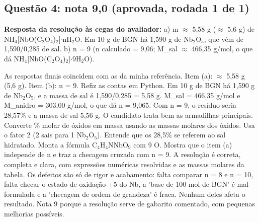 \documentclass{article}%
\begin{document}
\subsection*{Questão 4: nota 9,0 (aprovada, rodada 1 de 1)}%
\textbf{Resposta da resolução às cegas do avaliador:} a) m $\approx$ 5,58 g ($\approx$ 5,6 g) de NH$_{4}${[}NbO(C$_{2}$O$_{4}$)$_{2}${]}$\cdot$nH$_{2}$O. Em 10 g de BGN há 1,590 g de Nb$_{2}$O$_{5}$, que vêm de 1,590/0,285 de sal.\newline%
b) n = 9 (n calculado = 9,06; M\_sal $\approx$ 466,35 g/mol, o que dá NH$_{4}${[}NbO(C$_{2}$O$_{4}$)$_{2}${]}$\cdot$9H$_{2}$O).\par %
As respostas finais coincidem com as da minha referência. Item (a): $\approx$ 5,58 g (5,6 g). Item (b): n = 9. Refiz as contas em Python. Em 10 g de BGN há 1,590 g de Nb$_{2}$O$_{5}$, e a massa de sal é 1,590/0,285 = 5,58 g. M\_sal = 466,35 g/mol e M\_anidro = 303,00 g/mol, o que dá n = 9,065. Com n = 9, o resíduo seria 28,57\% e a massa de sal 5,56 g. O candidato trata bem as armadilhas principais. Converte \% molar de óxidos em massa usando as massas molares dos óxidos. Usa o fator 2 (2 sais para 1 Nb$_{2}$O$_{5}$). Entende que os 28,5\% se referem ao sal hidratado. Monta a fórmula C$_{4}$H$_{4}$NNbO$_{9}$ com 9 O. Mostra que o item (a) independe de n e traz a checagem cruzada com n = 9. A resolução é correta, completa e clara, com expressões numéricas resolvidas e as massas molares da tabela. Os defeitos são só de rigor e acabamento: falta comparar n = 8 e n = 10, falta checar o estado de oxidação +5 do Nb, a 'base de 100 mol de BGN' é mal formulada e a 'checagem de ordem de grandeza' é fraca. Nenhum deles afeta o resultado. Nota 9 porque a resolução serve de gabarito comentado, com pequenas melhorias possíveis.%
\end{document}
